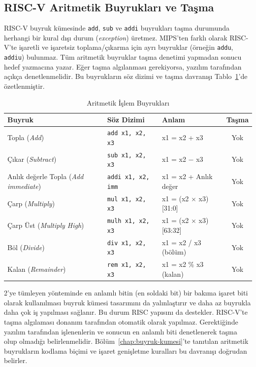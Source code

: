 \subsection{RISC-V Aritmetik Buyrukları ve Taşma}

RISC-V buyruk kümesinde \texttt{add}, \texttt{sub} ve \texttt{addi} buyrukları taşma durumunda herhangi bir kural dışı durum (\emph{exception}) üretmez. MIPS'ten farklı olarak RISC-V'te işaretli ve işaretsiz toplama/çıkarma için ayrı buyruklar (örneğin \texttt{addu}, \texttt{addiu}) bulunmaz. Tüm aritmetik buyruklar taşma denetimi yapmadan sonucu hedef yazmacına yazar. Eğer taşma algılanması gerekiyorsa, yazılım tarafından açıkça denetlenmelidir. Bu buyrukların söz dizimi ve taşma davranışı Tablo~\ref{tab:ari-aritmetik-buyruklar}'de özetlenmiştir.

\begin{table}[htbp]
\centering
\caption{Aritmetik İşlem Buyrukları}
\label{tab:ari-aritmetik-buyruklar}
\small
\begin{tabularx}{\textwidth}{l l X c}
\toprule
\textbf{Buyruk} & \textbf{Söz Dizimi} & \textbf{Anlam} & \textbf{Taşma} \\
\midrule
Topla (\emph{Add}) & \texttt{add x1, x2, x3} & x1 = x2 + x3 & Yok \\
Çıkar (\emph{Subtract}) & \texttt{sub x1, x2, x3} & x1 = x2 $-$ x3 & Yok \\
Anlık değerle Topla (\emph{Add immediate}) & \texttt{addi x1, x2, imm} & x1 = x2 + Anlık değer & Yok \\
Çarp (\emph{Multiply}) & \texttt{mul x1, x2, x3} & x1 = (x2 $\times$ x3)[31:0] & Yok \\
Çarp Üst (\emph{Multiply High}) & \texttt{mulh x1, x2, x3} & x1 = (x2 $\times$ x3)[63:32] & Yok \\
Böl (\emph{Divide}) & \texttt{div x1, x2, x3} & x1 = x2 / x3 (bölüm) & Yok \\
Kalan (\emph{Remainder}) & \texttt{rem x1, x2, x3} & x1 = x2 \% x3 (kalan) & Yok \\
\bottomrule
\end{tabularx}
\end{table}

2'ye tümleyen yönteminde en anlamlı bitin (en soldaki bit) bir bakıma işaret biti olarak kullanılması buyruk kümesi tasarımını da yalınlaştırır ve daha az buyrukla daha çok iş yapılması sağlanır. Bu durum RISC yapısını da destekler. RISC-V'te taşma algılaması donanım tarafından otomatik olarak yapılmaz. Gerektiğinde yazılım tarafından işlenenlerin ve sonucun en anlamlı biti denetlenerek taşma olup olmadığı belirlenmelidir. Bölüm~\ref{chap:buyruk-kumesi}'te tanıtılan aritmetik buyrukların kodlama biçimi ve işaret genişletme kuralları bu davranışı doğrudan belirler.


